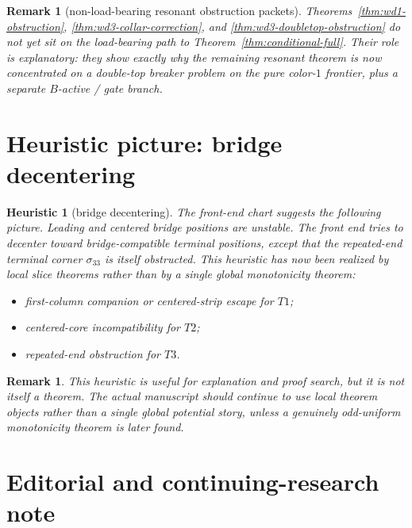 \documentclass[11pt]{article}
\newtheorem{remark}[theorem]{Remark}
\newtheorem{heuristic}[theorem]{Heuristic}
\newcommand{\sig}[2]{\sigma_{#1#2}}
\begin{document}
\begin{remark}[non-load-bearing resonant obstruction packets]
Theorems~\ref{thm:wd1-obstruction}, \ref{thm:wd3-collar-correction}, and
\ref{thm:wd3-doubletop-obstruction} do not yet sit on the load-bearing path to
Theorem~\ref{thm:conditional-full}.
Their role is explanatory: they show exactly why the remaining resonant theorem
is now concentrated on a double-top breaker problem on the pure color-$1$
frontier, plus a separate $B$-active / gate branch.
\end{remark}

\section{Heuristic picture: bridge decentering}

\begin{heuristic}[bridge decentering]
The front-end chart suggests the following picture.
Leading and centered bridge positions are unstable.
The front end tries to decenter toward bridge-compatible terminal positions,
except that the repeated-end terminal corner \(\sig33\) is itself obstructed.
This heuristic has now been realized by local slice theorems rather than by a
single global monotonicity theorem:
\begin{itemize}[leftmargin=2.4em]
\item first-column companion or centered-strip escape for \(T1\);
\item centered-core incompatibility for \(T2\);
\item repeated-end obstruction for \(T3\).
\end{itemize}
\end{heuristic}

\begin{remark}
This heuristic is useful for explanation and proof search, but it is not itself
a theorem.
The actual manuscript should continue to use local theorem objects rather than a
single global potential story, unless a genuinely odd-uniform monotonicity
theorem is later found.
\end{remark}


\section{Editorial and continuing-research note}
\end{document}
